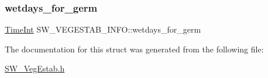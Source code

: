 \mbox{\label{struct_s_w___v_e_g_e_s_t_a_b___i_n_f_o_a6dce2c86264b4452fcf91d73cee9c5d3}} 
\subsubsection{\texorpdfstring{wetdays\+\_\+for\+\_\+germ}{wetdays\_for\_germ}}
{\footnotesize\ttfamily \hyperlink{_times_8h_a25ac787161a5cad0e3fdfe5a5aeb3236}{Time\+Int} S\+W\+\_\+\+V\+E\+G\+E\+S\+T\+A\+B\+\_\+\+I\+N\+F\+O\+::wetdays\+\_\+for\+\_\+germ}



The documentation for this struct was generated from the following file\+:\begin{DoxyCompactItemize}
\item 
\hyperlink{_s_w___veg_estab_8h}{S\+W\+\_\+\+Veg\+Estab.\+h}\end{DoxyCompactItemize}
